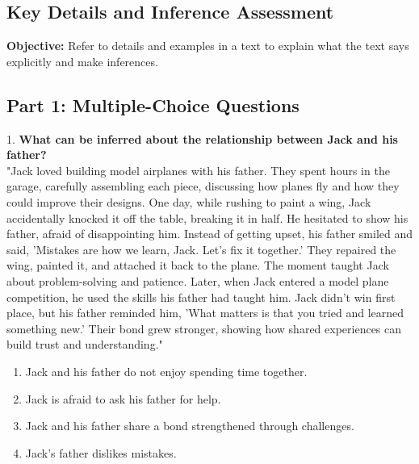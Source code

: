 \documentclass[12pt]{article}
\begin{document}
\subsection*{Key Details and Inference Assessment}
\onehalfspacing

\begin{tcolorbox}[colframe=black!40, colback=gray!0, title=Learning Objective]
\textbf{Objective:} Refer to details and examples in a text to explain what the text says explicitly and make inferences.
\end{tcolorbox}

\subsection*{Part 1: Multiple-Choice Questions}

1. \textbf{What can be inferred about the relationship between Jack and his father?\\}
"Jack loved building model airplanes with his father. They spent hours in the garage, carefully assembling each piece, discussing how planes fly and how they could improve their designs. One day, while rushing to paint a wing, Jack accidentally knocked it off the table, breaking it in half. He hesitated to show his father, afraid of disappointing him. Instead of getting upset, his father smiled and said, 'Mistakes are how we learn, Jack. Let’s fix it together.' They repaired the wing, painted it, and attached it back to the plane. The moment taught Jack about problem-solving and patience. Later, when Jack entered a model plane competition, he used the skills his father had taught him. Jack didn’t win first place, but his father reminded him, 'What matters is that you tried and learned something new.' Their bond grew stronger, showing how shared experiences can build trust and understanding."\\
\begin{enumerate}[label=\Alph*.]
    \item Jack and his father do not enjoy spending time together.  
    \item Jack is afraid to ask his father for help.  
    \item Jack and his father share a bond strengthened through challenges.  
    \item Jack’s father dislikes mistakes.  
\end{enumerate}
\end{document}
